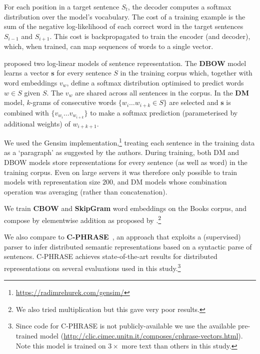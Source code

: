 For each position in a target sentence \(S_t\), the decoder computes a softmax distribution over the model's vocabulary. The cost of a training example is the sum of the negative log-likelihood of each correct word in the target sentences \(S_{i-1}\) and \(S_{i+1}\). This cost is backpropagated to train the encoder (and decoder), which, when trained, can map sequences of words to a single vector.

\vspace{5pt} \cite{le2014distributed} proposed two log-linear models of sentence representation. The {\bf DBOW} model learns a vector \(\mathbf{s}\) for every sentence \(S\) in the training corpus which, together with word embeddings \(v_w\), define a softmax distribution optimised to predict words \(w \in S\) given \(S\). The \(v_w\) are shared across all sentences in the corpus. In the {\bf DM} model, \(k\)-grams of consecutive words \(\{w_i \dots w_{i+k} \in S\}\) are selected and \(\mathbf{s}\) is combined with \(\{v_{w_i} \dots v_{w_{i+k}} \}\) to make a softmax prediction (parameterised by additional weights) of \(w_{i+k+1}\). 

We used the Gensim implementation,\footnote{\scriptsize \url{https://radimrehurek.com/gensim/}} treating each sentence in the training data as a `paragraph' as suggested by the authors. During training, both DM and DBOW models store representations for every sentence (as well as word) in the training corpus. Even on large servers it was therefore only possible to train models with representation size \(200\), and DM models whose combination operation was averaging (rather than concatenation). 

\vspace{5pt} We train {\bf CBOW} and {\bf SkipGram} word embeddings \cite{mikolov2013distributed} on the Books corpus, and compose by elementwise addition as proposed by \cite{mitchell2010composition}.\footnote{We also tried multiplication but this gave very poor results.} 

We also compare to {\bf C-PHRASE}~\cite{marcobaronijointly}, an approach that exploits a (supervised) parser to infer distributed semantic representations based on a syntactic parse of sentences. C-PHRASE achieves state-of-the-art results for distributed representations on several evaluations used in this study.\footnote{Since code for C-PHRASE is not publicly-available we use the available pre-trained model ({\scriptsize \url{http://clic.cimec.unitn.it/composes/cphrase-vectors.html}}). Note this model is trained on \(3\times\) more text than others in this study.}

